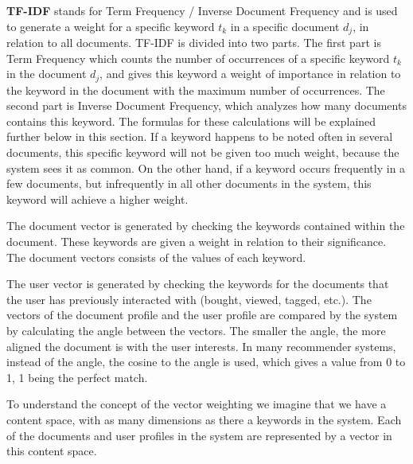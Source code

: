 \textbf{TF-IDF} stands for Term Frequency / Inverse Document Frequency and is used to generate a weight for a specific keyword \(t_{k}\) in a specific document \(d_{j}\), in relation to all documents. TF-IDF is divided into two parts.\newline
The first part is Term Frequency which counts the number of occurrences of a specific keyword \(t_{k}\) in the document \(d_{j}\), and gives this keyword a weight of importance in relation to the keyword in the document with the maximum number of occurrences. %
The second part is Inverse Document Frequency, which analyzes how many documents contains this keyword. The formulas for these calculations will be explained further below in this section. \newline
If a keyword happens to be noted often in several documents, this specific keyword will not be given too much weight, because the system sees it as common. On the other hand, if a keyword occurs frequently in a few documents, but infrequently in all other documents in the system, this keyword will achieve a higher weight.\newline

The document vector is generated by checking the keywords contained within the document. These keywords are given a weight in relation to their significance. The document vectors consists of the values of each keyword. 

The user vector is generated by checking the keywords for the documents that the user has previously interacted with (bought, viewed, tagged, etc.).\newline
The vectors of the document profile and the user profile are compared by the system by calculating the angle between the vectors. The smaller the angle, the more aligned the document is with the user interests. In many recommender systems, instead of the angle, the cosine to the angle is used, which gives a value from 0 to 1, 1 being the perfect match.\newline

To understand the concept of the vector weighting we imagine that we have a content space, with as many dimensions as there a keywords in the system. Each of the documents and user profiles in the system are represented by a vector in this content space.\newline


